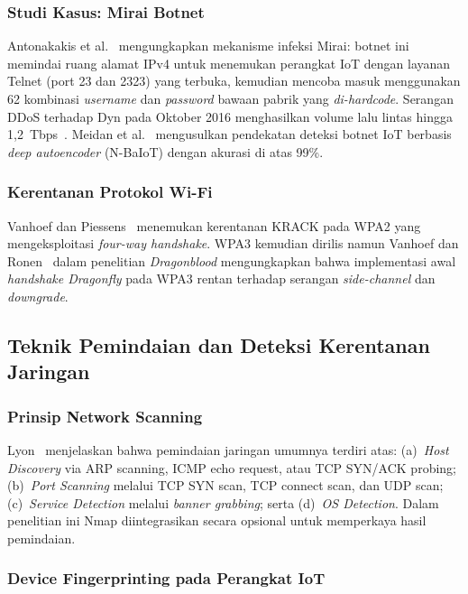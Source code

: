 \documentclass[conference]{IEEEtran}
\begin{document}
\subsubsection{Studi Kasus: Mirai Botnet}

Antonakakis et al.\ \cite{antonakakis2017} mengungkapkan mekanisme
infeksi Mirai: botnet ini memindai ruang alamat IPv4 untuk menemukan
perangkat IoT dengan layanan Telnet (port 23 dan 2323) yang terbuka,
kemudian mencoba masuk menggunakan 62 kombinasi \textit{username} dan
\textit{password} bawaan pabrik yang \textit{di-hardcode}. Serangan DDoS
terhadap Dyn pada Oktober 2016 menghasilkan volume lalu lintas hingga
1,2~Tbps~\cite{kolias2017}. Meidan et al.\ \cite{meidan2018} mengusulkan
pendekatan deteksi botnet IoT berbasis \textit{deep autoencoder} (N-BaIoT)
dengan akurasi di atas 99\%.

\subsubsection{Kerentanan Protokol Wi-Fi}

Vanhoef dan Piessens~\cite{vanhoef2017} menemukan kerentanan KRACK
pada WPA2 yang mengeksploitasi \textit{four-way handshake}. WPA3
kemudian dirilis namun Vanhoef dan Ronen~\cite{vanhoef2020} dalam
penelitian \textit{Dragonblood} mengungkapkan bahwa implementasi awal
\textit{handshake Dragonfly} pada WPA3 rentan terhadap serangan
\textit{side-channel} dan \textit{downgrade}.

\subsection{Teknik Pemindaian dan Deteksi Kerentanan Jaringan}

\subsubsection{Prinsip Network Scanning}

Lyon~\cite{lyon2009} menjelaskan bahwa pemindaian jaringan umumnya
terdiri atas: (a)~\textit{Host Discovery} via ARP scanning, ICMP echo
request, atau TCP SYN/ACK probing; (b)~\textit{Port Scanning} melalui
TCP SYN scan, TCP connect scan, dan UDP scan; (c)~\textit{Service
Detection} melalui \textit{banner grabbing}; serta (d)~\textit{OS
Detection}. Dalam penelitian ini Nmap diintegrasikan secara opsional
untuk memperkaya hasil pemindaian.

\subsubsection{Device Fingerprinting pada Perangkat IoT}
\end{document}
